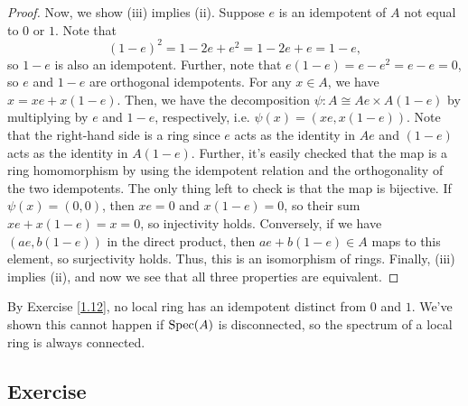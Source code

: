 \begin{proof}
Now, we show (iii) implies (ii). Suppose $e$ is an idempotent of $A$ not equal to $0$ or $1$. Note that
$$(1-e)^2 = 1 - 2e + e^2 = 1 - 2e + e = 1 - e,$$
so $1-e$ is also an idempotent. Further, note that $e(1-e) = e - e^2 = e - e = 0$, so $e$ and $1-e$ are orthogonal idempotents. For any $x \in A$, we have
$x = xe + x(1-e)$. Then, we have the decomposition $\psi : A \cong Ae \times A(1-e)$ by multiplying by $e$ and $1-e$, respectively, i.e. $\psi(x) = (xe,x(1-e))$. 
Note that the right-hand side is a ring since $e$ acts as the identity in $Ae$ and $(1-e)$ acts as the identity in $A(1-e)$. Further, it's easily checked that the 
map is a ring homomorphism by using the idempotent relation and the orthogonality of the two idempotents. The only thing left to check is that the map is bijective.
If $\psi(x) = (0,0)$, then $xe=0$ and $x(1-e) = 0$, so their sum $xe + x(1-e) = x = 0$, so injectivity holds. Conversely, if we have $(ae,b(1-e))$ in the direct product, 
then $ae + b(1-e) \in A$ maps to this element, so surjectivity holds. Thus, this is an isomorphism of rings. Finally, (iii) implies (ii), and now we see that 
all three properties are equivalent.
\end{proof}

\begin{remark}
By Exercise \ref{1.12}, no local ring has an idempotent distinct from $0$ and $1$. We've shown this cannot happen if $\operatorname{Spec}(A)$ is disconnected, so the spectrum of
a local ring is always connected.
\end{remark}

\subsection{Exercise}\label{1.23}

